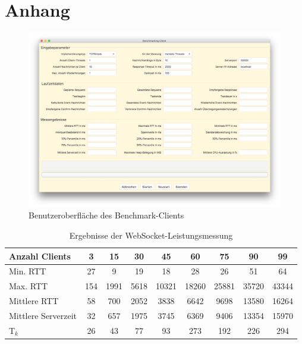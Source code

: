 \documentclass[11pt,a4paper,titlepage]{scrartcl}
\numberwithin{equation}{section}
\begin{document}
\section{Anhang}
\begin{figure}[ht] 
	\begin{center}
		\includegraphics[scale=0.17]{img/benchClientUI.jpg}
		\caption[]{Benutzeroberfläche des Benchmark-Clients}
		\label{fig:dakoBenchClientUI}
	\end{center}
\end{figure}

\renewcommand{\arraystretch}{1.5}
\begin{table}[ht]
	\begin{center}
		\begin{tabular}{|l|c|c|c|c|c|c|c|c|}
			\hline
			Anzahl Clients& \cellcolor{lightgrey}\textbf{3} & \textbf{15} & \cellcolor{lightgrey}\textbf{30} & \textbf{45} &\cellcolor{lightgrey}\textbf{60} & \textbf{75} & \cellcolor{lightgrey}\textbf{90} & \textbf{99} \\ \hline
			Min. RTT & \cellcolor{lightgrey}27 & 9 &\cellcolor{lightgrey}19 & 18 & \cellcolor{lightgrey}28 & 26 & \cellcolor{lightgrey}51 & 64 \\ \hline
			Max. RTT & \cellcolor{lightgrey}154 & 1991 & \cellcolor{lightgrey}5618 & 10321 & \cellcolor{lightgrey}18260 & 25881 & \cellcolor{lightgrey}35720 & 43344\\ \hline
			Mittlere RTT & \cellcolor{lightgrey}58 & 700 & \cellcolor{lightgrey}2052 & 3838 & \cellcolor{lightgrey}6642 & 9698 & \cellcolor{lightgrey}13580 & 16264 \\ \hline
			Mittlere Serverzeit & \cellcolor{lightgrey}32 & 657 & \cellcolor{lightgrey}1975 & 3745 & \cellcolor{lightgrey}6369 & 9406 & \cellcolor{lightgrey}13354 & 15970 \\ \hline
			T$_{k}$ & \cellcolor{lightgrey}26 & 43 & \cellcolor{lightgrey}77 & 93 & \cellcolor{lightgrey}273 & 192 & \cellcolor{lightgrey}226 & 294 \\ \hline
		\end{tabular}
		\caption{Ergebnisse der WebSocket-Leistungsmessung}\label{tbl:evalWebSocket}
	\end{center}
\end{table}
\renewcommand{\arraystretch}{1}
\end{document}
